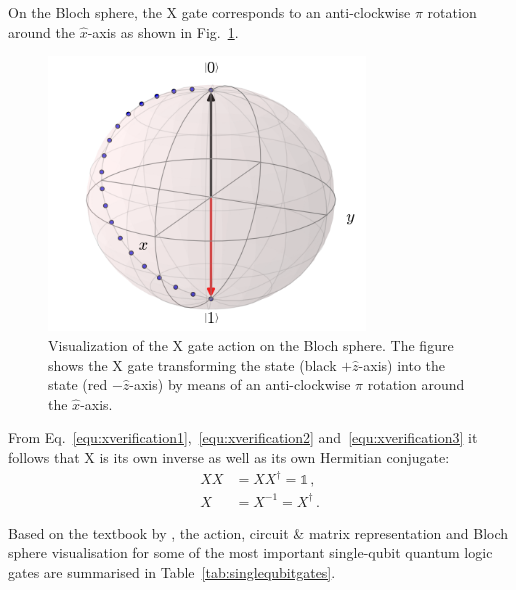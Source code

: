 On the Bloch sphere, the X gate corresponds to an anti-clockwise $\pi$ rotation around the $\hat{x}$-axis as shown in Fig.~\ref{img:blochxgate}.

\begin{figure}[ht]
   \centering
   \includegraphics[width=0.75\textwidth]{img/blochxgate.png}
   \caption{Visualization of the X gate action on the Bloch sphere. The figure shows the X gate transforming the \0 state (black $+\hat{z}$-axis) into the \1 state (red $-\hat{z}$-axis) by means of an anti-clockwise $\pi$ rotation around the $\hat{x}$-axis.}
   \label{img:blochxgate}
\end{figure}

From Eq.~\ref{equ:xverification1},~\ref{equ:xverification2} and~\ref{equ:xverification3} it follows that X is its own inverse as well as its own Hermitian conjugate:
\begin{align}
XX &= XX^\dagger = \mathbb{1}\, , \\
X &= X^{-1} = X^\dagger\, .
\end{align}

Based on the textbook by , the action, circuit \& matrix representation and Bloch sphere visualisation for some of the most important single-qubit quantum logic gates are summarised in Table~\ref{tab:singlequbitgates}.

